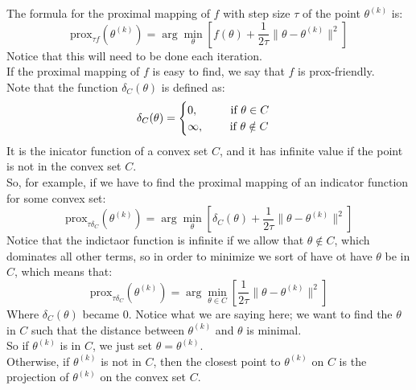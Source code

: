\documentclass[12pt]{article}
\begin{document}
The formula for the proximal mapping of $f$
with step size $\tau$ of the point $\theta^{(k)}$
is:
\[ \text{prox}_{\tau f}(\theta^{(k)}) 
= \arg\min_{\theta} \left[ f(\theta) 
+ \frac{1}{2\tau} \|\theta - \theta^{(k)}\|^2 
\right] \]
Notice that this will need to be done
each iteration. \\

If the proximal mapping of $f$ is easy to find,
we say that $f$ is prox-friendly. \\

Note that the function $\delta_C(\theta)$
is defined as:
\[ \delta_C(\theta)
= \begin{cases} 
    0, \qquad \;\; \text{ if }  \theta \in C \\
    \infty, \qquad \text{ if } \theta \notin C
 \end{cases} \]
It is the inicator function of a convex set $C$,
and it has infinite value if the point
is not in the convex set $C$. \\

So, for example, if we have
to find the proximal mapping of an indicator
function for some convex set:
\[ \text{prox}_{\tau \delta_C}(\theta^{(k)})
= \arg\min_{\theta} \left[ \delta_C(\theta) 
+ \frac{1}{2\tau} \|\theta - \theta^{(k)}\|^2 
\right] \]
Notice that the indictaor function is infinite
if we allow that $\theta \notin C$,
which dominates all other terms, so in order
to minimize we sort of have ot have $\theta$
be in $C$, which means that:
\[ \text{prox}_{\tau \delta_C}(\theta^{(k)})
= \arg\min_{\theta \in C} \left[ \frac{1}{2\tau} 
\|\theta - \theta^{(k)}\|^2 \right] \]
Where $\delta_C(\theta)$ became $0$.
Notice what we are saying here;
we want to find the $\theta$
in $C$ such that the distance between 
$\theta^{(k)}$ and $\theta$ is minimal. \\
So if $\theta^{(k)}$ is in $C$,
we just set $\theta = \theta^{(k)}$. \\
Otherwise, if $\theta^{(k)}$ is not in $C$,
then the closest point to $\theta^{(k)}$
on $C$ is the projection of $\theta^{(k)}$
on the convex set $C$. \\
\end{document}

